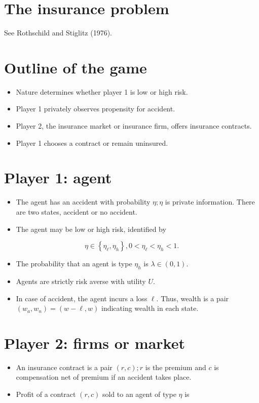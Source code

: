 \documentclass[10pt]{article}
\begin{document}
\captionsetup{singlelinecheck=false}
\section*{The insurance problem}
See Rothschild and Stiglitz (1976).

\section*{Outline of the game}
\begin{itemize}
  \item Nature determines whether player 1 is low or high risk.
  \item Player 1 privately observes propensity for accident.
  \item Player 2, the insurance market or insurance firm, offers insurance contracts.
  \item Player 1 chooses a contract or remain uninsured.
\end{itemize}

\section*{Player 1: agent}
\begin{itemize}
  \item The agent has an accident with probability $\eta ; \eta$ is private information. There are two states, accident or no accident.
  \item The agent may be low or high risk, identified by
\end{itemize}

$$
\eta \in\left\{\eta_{\ell}, \eta_{h}\right\}, 0<\eta_{\ell}<\eta_{h}<1 .
$$

\begin{itemize}
  \item The probability that an agent is type $\eta_{h}$ is $\lambda \in(0,1)$.
  \item Agents are strictly risk averse with utility $U$.
  \item In case of accident, the agent incurs a loss $\ell$. Thus, wealth is a pair $\left(w_{a}, w_{n}\right)=(w-\ell, w)$ indicating wealth in each state.
\end{itemize}

\section*{Player 2: firms or market}
\begin{itemize}
  \item An insurance contract is a pair $(r, c) ; r$ is the premium and $c$ is compensation net of premium if an accident takes place.
  \item Profit of a contract $(r, c)$ sold to an agent of type $\eta$ is
\end{itemize}
\end{document}

